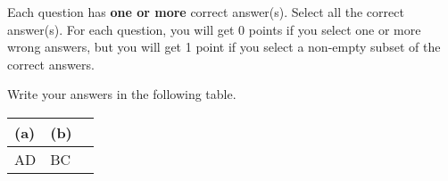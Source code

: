 
Each question has \textbf{one or more} correct answer(s). Select all the correct answer(s). For each question, you will get 0 points if you select one or more wrong answers, but you will get 1 point if you select a non-empty subset of the correct answers.

Write your answers in the following table.


\begin{table}[htbp]
    \centering
    \begin{tabular}{|p{2cm}|p{2cm}|p{2cm}|}
        \hline
        (a) & (b) \\
        \hline
        AD  & BC  \\
        \hline
    \end{tabular}
\end{table}

